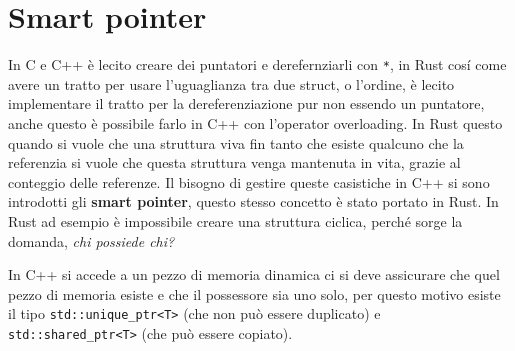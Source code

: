\documentclass[12pt]{article}
\begin{document}
\section{Smart pointer}
In C e C++ \`e lecito creare dei puntatori e derefernziarli con \texttt{*}, in Rust cos\'i come avere un tratto per usare l'uguaglianza tra due struct, o l'ordine, \`e lecito implementare il tratto per la dereferenziazione pur non essendo un puntatore, anche questo \`e possibile farlo in C++ con l'operator overloading. In Rust questo quando si vuole che una struttura viva fin tanto che esiste qualcuno che la referenzia si vuole che questa struttura venga mantenuta in vita, grazie al conteggio delle referenze. Il bisogno di gestire queste casistiche in C++ si sono introdotti gli \textbf{smart pointer}, questo stesso concetto \`e stato portato in Rust. In Rust ad esempio \`e impossibile creare una struttura ciclica, perch\'e sorge la domanda, \emph{chi possiede chi?}

In C++ si accede a un pezzo di memoria dinamica ci si deve assicurare che quel pezzo di memoria esiste e che il possessore sia uno solo, per questo motivo esiste il tipo \texttt{std::unique\_ptr<T>} (che non pu\`o essere duplicato) e \texttt{std::shared\_ptr<T>} (che pu\`o essere copiato).
\end{document}
